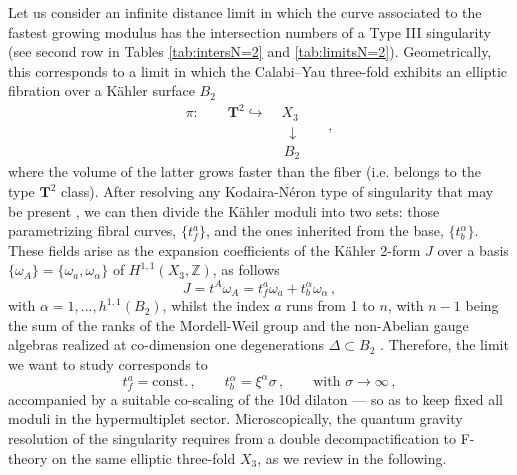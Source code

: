 Let us consider an infinite distance limit in which the curve associated to the fastest growing modulus has the intersection numbers of a Type III singularity (see second row in Tables \ref{tab:intersN=2} and \ref{tab:limitsN=2}). Geometrically, this corresponds to a limit in which the Calabi--Yau three-fold exhibits an elliptic fibration  over a K\"ahler surface $B_2$
%
\begin{equation}\label{eq:ellfibration}
			\begin{aligned}
				\pi: \qquad \mathbf{T}^2 \hookrightarrow &\;X_{3} \\
				&\;\; \downarrow \qquad , \\ &\ \ B_{2}
			\end{aligned}
\end{equation}
%
where the volume of the latter grows faster than the fiber (i.e.  belongs to the type $\mathbf{T}^2$ class).
After resolving any Kodaira-Néron type of singularity that may be present \cite{Weigand:2018rez}, we can then divide the K\"ahler moduli into two sets: those parametrizing fibral curves, $\lbrace t^a_f \rbrace$, and the ones inherited from the base, $\lbrace t^{\alpha}_b \rbrace$. These fields arise as the expansion coefficients of the K\"ahler 2-form $J$ over a basis $\lbrace \omega_A \rbrace = \lbrace \omega_a, \omega_{\alpha} \rbrace$ of $H^{1,1}(X_3, \mathbb{Z})$, as follows
%
\begin{equation}
		J= t^A \omega_A = t^a_f \omega_a + t^{\alpha}_b \omega_{\alpha} \, , 
\end{equation}
%
with $\alpha=1,\ldots, h^{1,1}(B_2)$, whilst the index $a$ runs from 1 to $n$, with $n-1$ being the sum of the ranks of the Mordell-Weil group and the non-Abelian gauge algebras realized at co-dimension one degenerations $\Delta \subset B_2$ \cite{wazir_2004}.
Therefore, the limit we want to study corresponds to
%
\begin{equation}\label{eq:n=2limit}
	t^a_f = \text{const.}\, , \qquad t^{\alpha}_b = \xi^{\alpha} \sigma\, , \qquad \text{with}\, \, \sigma\to \infty\, , 
\end{equation}
%
accompanied by a suitable co-scaling of the 10d dilaton --- so as to keep fixed all moduli in the hypermultiplet sector. Microscopically, the quantum gravity resolution of the singularity requires from a double decompactification to F-theory on the same elliptic three-fold $X_3$, as we review in the following.
	
